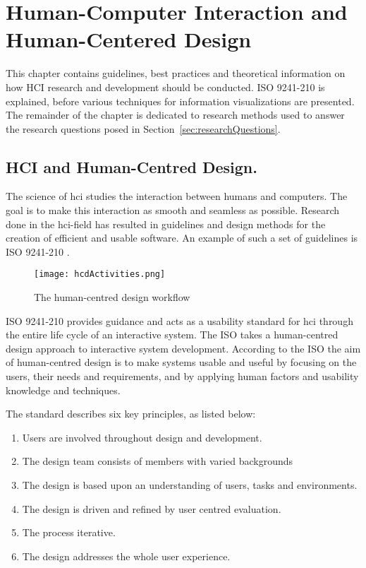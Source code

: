 \chapter{Human-Computer Interaction and Human-Centered Design}
\label{ch:hci}
This chapter contains guidelines, best practices and theoretical information on how HCI research and development should be conducted. ISO 9241-210 is explained, before various techniques for information visualizations are presented. The remainder of the chapter is dedicated to research methods used to answer the research questions posed in Section~\ref{sec:researchQuestions}.

\section{HCI and Human-Centred Design.}
The science of \gls{hci} studies the interaction between humans and computers. The goal is to make this interaction as smooth and seamless as possible. Research done in the \gls{hci}-field has resulted in guidelines and design methods for the creation of efficient and usable software. An example of such a set of guidelines is ISO 9241-210 \cite{iso9241}.

\begin{figure}[h!]
	\centering
		\texttt{[image: hcdActivities.png]}
		\caption[ISO 9241-210 workflow]{The human-centred design workflow}
		\label{fig:hcdActivities}
\end{figure}

ISO 9241-210 provides guidance and acts as a usability standard for \gls{hci} through the entire life cycle of an interactive system. The ISO takes a human-centred design approach to interactive system development. According to the ISO the aim of human-centred design is to make systems usable and useful by focusing on the users, their needs and requirements, and by applying human factors and usability knowledge and techniques.  

The standard describes six key principles, as listed below: 
\begin{enumerate}
  \item Users are involved throughout design and development.
  \item The design team consists of members with varied backgrounds
  \item The design is based upon an understanding of users, tasks and environments.
  \item The design is driven and refined by user centred evaluation.
  \item The process iterative.
  \item The design addresses the whole user experience.
\end{enumerate}

